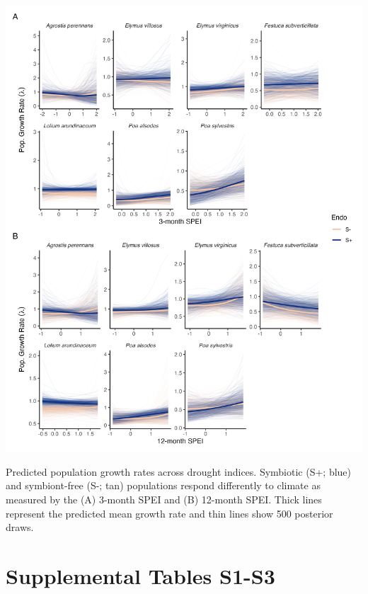 \documentclass[lineno, sn-basic]{sn-jnl}%
\begin{document}
\begin{myfigure}[H]
	\centering
	\includegraphics[width=.7\linewidth]{spei_combo_lambda_plot.png}
	\caption[Predicted population growth rates across drought indices]{Predicted population growth rates across drought indices. Symbiotic (S+; blue) and symbiont-free (S-; tan) populations respond differently to climate as measured by the (A) 3-month SPEI and (B) 12-month SPEI. Thick lines represent the predicted mean growth rate and thin lines show 500 posterior draws.}
\end{myfigure}



\newpage

\section{Supplemental Tables S1-S3}\label{Suptabs}

\renewcommand\thetable{S\arabic{table}}   
\end{document}

